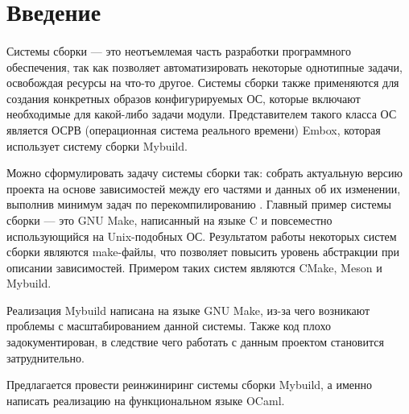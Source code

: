 
\section*{Введение}
\thispagestyle{withCompileDate}

\paragraph{} Системы сборки --- это неотъемлемая часть разработки программного обеспечения, так как позволяет автоматизировать некоторые однотипные задачи, освобождая ресурсы на что-то другое. Системы сборки также применяются для создания конкретных образов конфигурируемых ОС, которые включают необходимые для какой-либо задачи модули. Представителем такого класса ОС является ОСРВ (операционная система реального времени) Embox, которая использует систему сборки Mybuild.

Можно сформулировать задачу системы сборки так: собрать актуальную версию проекта на основе зависимостей между его частями и данных об их изменении, выполнив минимум задач по перекомпилированию \cite{mokhov2018build}. Главный пример системы сборки --- это GNU Make, написанный на языке C и повсеместно использующийся на Unix-подобных ОС. Результатом работы некоторых систем сборки являются make-файлы, что позволяет повысить уровень абстракции при описании зависимостей. Примером таких систем являются CMake, Meson и Mybuild.

Реализация Mybuild написана на языке GNU Make, из-за чего возникают проблемы с масштабированием данной системы. Также код плохо задокументирован, в следствие чего работать с данным проектом становится затруднительно.

Предлагается провести реинжиниринг системы сборки Mybuild, а именно написать реализацию на функциональном языке OCaml.

